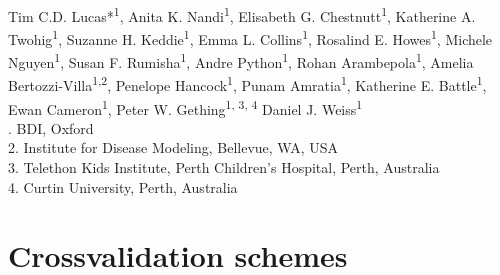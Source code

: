\documentclass[10pt,a4]{article}
\begin{document}
\vspace*{0.2in}

\begin{flushleft}
{\Large
\textbf{} %
}
\newline
\\
Tim C.D. Lucas*\textsuperscript{1}, 
Anita K. Nandi\textsuperscript{1},
Elisabeth G. Chestnutt\textsuperscript{1},
Katherine A. Twohig\textsuperscript{1},
Suzanne H. Keddie\textsuperscript{1},
Emma L. Collins\textsuperscript{1},
Rosalind E. Howes\textsuperscript{1},
Michele Nguyen\textsuperscript{1},
Susan F. Rumisha\textsuperscript{1},
Andre Python\textsuperscript{1},
Rohan Arambepola\textsuperscript{1},
Amelia Bertozzi-Villa\textsuperscript{1,2},
Penelope Hancock\textsuperscript{1},
Punam Amratia\textsuperscript{1},
Katherine E. Battle\textsuperscript{1},
Ewan Cameron\textsuperscript{1},
Peter W. Gething\textsuperscript{1, 3, 4}
Daniel J. Weiss\textsuperscript{1}
\\
. BDI, Oxford\\
2. Institute for Disease Modeling, Bellevue, WA, USA\\
3. Telethon Kids Institute, Perth Children’s Hospital, Perth, Australia\\
4. Curtin University, Perth, Australia
\\
\bigskip

\end{flushleft}



% 
%


\section{Crossvalidation schemes}
\end{document}
